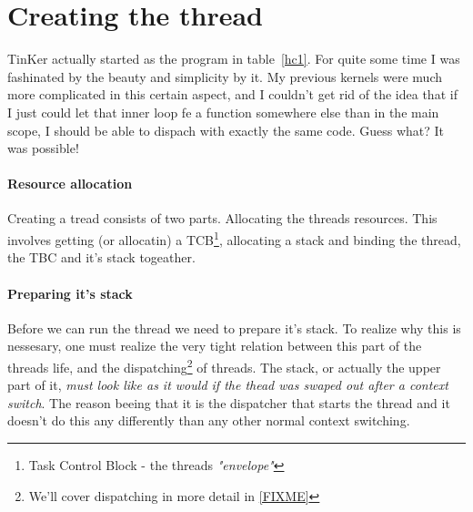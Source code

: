 {\section{Creating the thread}
\label{MakeOfThread}
	TinKer actually started as the program in table~\ref{hc1}. For quite some time I was fashinated by the beauty and simplicity by it. My previous kernels were much more complicated in this certain aspect, and I couldn't get rid of the idea that if I just could let that inner loop fe a function somewhere else than in the main scope, I should be able to dispach with exactly the same code. Guess what? It was possible!

	\paragraph{Resource allocation} 
		Creating a tread consists of two parts. Allocating the threads resources. This involves getting (or allocatin) a TCB\footnote{Task Control Block - the threads \textit{"envelope"}}, allocating a stack and binding the thread, the TBC and it's stack togeather.

	\paragraph{Preparing it's stack} 
		Before we can run the thread we need to prepare it's stack. To realize why this is nessesary, one must realize the very tight relation between this part of the threads life, and the dispatching\footnote{We'll cover dispatching in more detail in \ref{FIXME}} of threads. The stack, or actually the upper part of it, \textit{must look like as it would if the thead was swaped out after a context switch}. The reason beeing that it is the dispatcher that starts the thread and it doesn't do this any differently than any other normal context switching.

}
